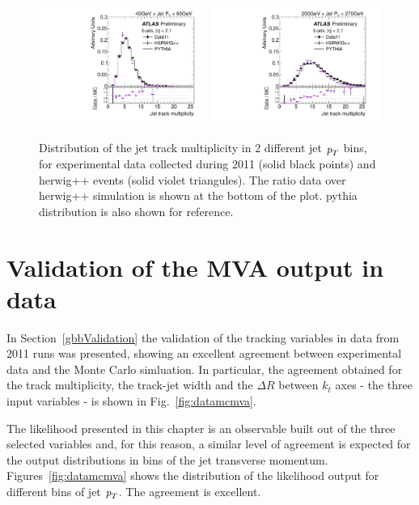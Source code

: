 \begin{figure}[tp]
\centering
\includegraphics[width=0.49\textwidth]{FIGS/systematics/DataVarNtrkPT040.pdf}
\includegraphics[width=0.49\textwidth]{FIGS/systematics/DataVarNtrkPT200.pdf}
\caption{Distribution of the jet track multiplicity in 2 different jet ${\emph{p}_{T}}$ bins, for experimental data  collected during 2011 (solid black points) and {\sc herwig}++ events (solid violet triangules). The ratio data over {\sc herwig}++ simulation is shown at the bottom of the plot. {\sc pythia} distribution is also shown for reference.}
\label{fig:herwigdatamc}
\end{figure}



\section{Validation of the MVA output in data}\label{sec:MVAvalidation}

In Section~\ref{gbbValidation} the validation of the tracking variables in data from 2011 runs was presented,  showing an excellent agreement between experimental data and the Monte Carlo simluation. In particular, the agreement obtained for the track multiplicity, the track-jet width and the $\Delta R$ between $k_t$ axes - the three input variables -  is shown in Fig.~\ref{fig:datamcmva}. 

The likelihood presented in this chapter is an observable built out of the three selected variables and, for this reason, a similar level of agreement is expected for the output distributions in bins of the jet transverse momentum.  Figures~\ref{fig:datamcmva} shows the distribution of the likelihood output for different bins of jet ${\emph{p}_{T}}$. The agreement is excellent.



